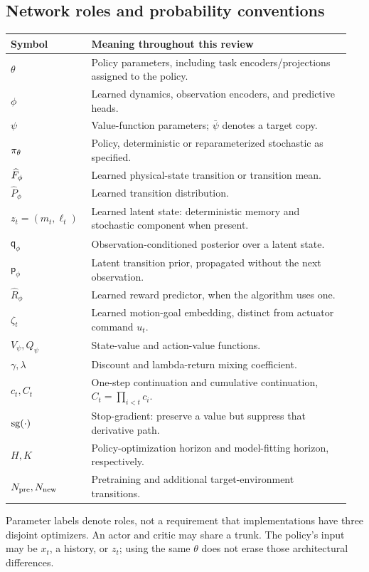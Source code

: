 \subsection{Network roles and probability conventions}
\begin{longtable}{@{}L{0.22\linewidth}L{0.73\linewidth}@{}}
\toprule Symbol & Meaning throughout this review\\\midrule\endhead
$\theta$ & Policy parameters, including task encoders/projections assigned to the policy.\\
$\phi$ & Learned dynamics, observation encoders, and predictive heads.\\
$\psi$ & Value-function parameters; $\bar\psi$ denotes a target copy.\\
$\pi_\theta$ & Policy, deterministic or reparameterized stochastic as specified.\\
$\widehat F_\phi$ & Learned physical-state transition or transition mean.\\
$\widehat P_\phi$ & Learned transition distribution.\\
$z_t=(m_t,\ell_t)$ & Learned latent state: deterministic memory and stochastic component when present.\\
$\mathsf q_\phi$ & Observation-conditioned posterior over a latent state.\\
$\mathsf p_\phi$ & Latent transition prior, propagated without the next observation.\\
$\widehat R_\phi$ & Learned reward predictor, when the algorithm uses one.\\
$\zeta_t$ & Learned motion-goal embedding, distinct from actuator command $u_t$.\\
$V_\psi,Q_\psi$ & State-value and action-value functions.\\
$\gamma,\lambda$ & Discount and lambda-return mixing coefficient.\\
$c_t,C_t$ & One-step continuation and cumulative continuation, $C_t=\prod_{i<t}c_i$.\\
$\operatorname{sg}(\cdot)$ & Stop-gradient: preserve a value but suppress that derivative path.\\
$H,K$ & Policy-optimization horizon and model-fitting horizon, respectively.\\
$N_{\rm pre},N_{\rm new}$ & Pretraining and additional target-environment transitions.\\
\bottomrule
\end{longtable}
Parameter labels denote roles, not a requirement that implementations have
three disjoint optimizers. An actor and critic may share a trunk. The policy's
input may be $x_t$, a history, or $z_t$; using the same $\theta$ does not erase
those architectural differences.

